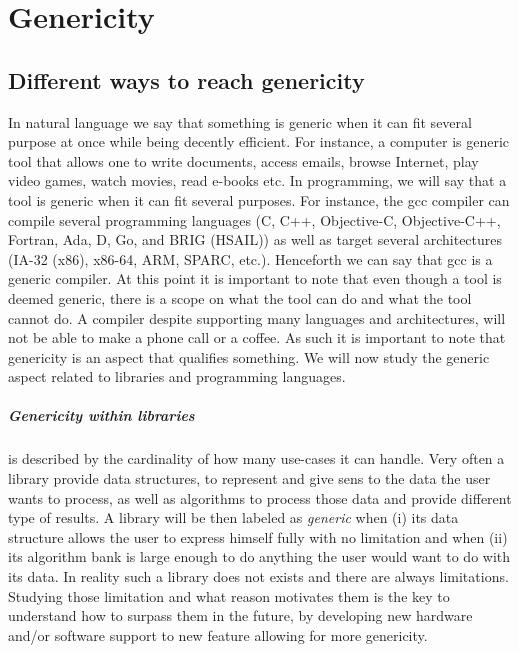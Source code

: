 \chapter{Genericity}

\section{Different ways to reach genericity}

In natural language we say that something is generic when it can fit several purpose at once while being decently
efficient. For instance, a computer is generic tool that allows one to write documents, access emails, browse Internet,
play video games, watch movies, read e-books etc. In programming, we will say that a tool is generic when it can fit
several purposes. For instance, the gcc compiler can compile several programming languages (C, C++, Objective-C,
Objective-C++, Fortran, Ada, D, Go, and BRIG (HSAIL)) as well as target several architectures (IA-32 (x86), x86-64, ARM,
SPARC, etc.). Henceforth we can say that gcc is a generic compiler. At this point it is important to note that even
though a tool is deemed generic, there is a scope on what the tool can do and what the tool cannot do. A compiler
despite supporting many languages and architectures, will not be able to make a phone call or a coffee. As such it is
important to note that genericity is an aspect that qualifies something. We will now study the generic aspect related to
libraries and programming languages.

\paragraph{Genericity within libraries} is described by the cardinality of how many use-cases it can handle. Very often
a library provide data structures, to represent and give sens to the data the user wants to process, as well as
algorithms to process those data and provide different type of results. A library will be then labeled as \emph{generic}
when (i) its data structure allows the user to express himself fully with no limitation and when (ii) its algorithm bank
is large enough to do anything the user would want to do with its data. In reality such a library does not exists and
there are always limitations. Studying those limitation and what reason motivates them is the key to understand how to
surpass them in the future, by developing new hardware and/or software support to new feature allowing for more
genericity.

